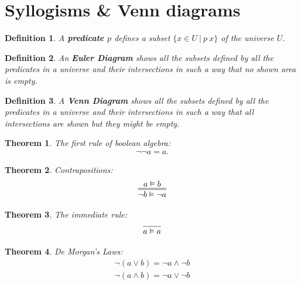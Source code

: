 \documentclass{article}
\theoremstyle{sltheorem}
\newtheorem{definition}{Definition}
\newtheorem{theorem}{Theorem}
\begin{document}
\section{Syllogisms \& Venn diagrams}
\begin{definition}
	A \textbf{predicate $p$} defines a subset $\{x\in U\:|\:p\:x\}$ of the universe $U$.
\end{definition}
\begin{definition}
	An \textbf{Euler Diagram} shows all the subsets defined by all the predicates in a universe and their intersections in such a way that no shown area is empty.
\end{definition}
\begin{definition}
	A \textbf{Venn Diagram} shows all the subsets defined by all the predicates in a universe and their intersections in such a way that all intersections are shown but they might be empty.
\end{definition}
\begin{theorem}
	The first rule of boolean algebra:
	\begin{gather*}
		\neg\neg a = a.
	\end{gather*}
\end{theorem}
\begin{theorem}
	Contrapositions:
	\begin{gather*}
		\infer={\neg b\vDash\neg a}{a\vDash b}
	\end{gather*}
\end{theorem}
\begin{theorem}
	The immediate rule:
	\begin{gather*}
		\infer{a\vDash a}{}
	\end{gather*}
\end{theorem}
\begin{theorem}
	De Morgan's Laws:
	\begin{gather*}
		\neg(a\vee b) = \neg a \wedge \neg b\\
		\neg(a\wedge b) = \neg a \vee \neg b
	\end{gather*}
\end{theorem}
\end{document}
